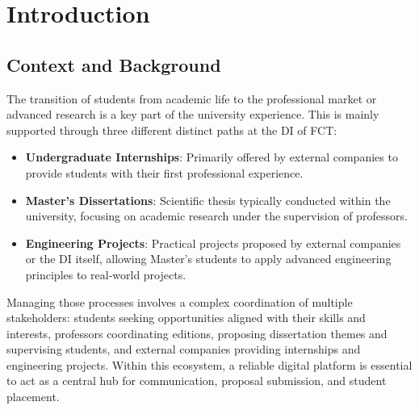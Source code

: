
%

\chapter{Introduction}
\label{cha:introduction}


\epigraphfontsize{\small\itshape}
\setlength\epigraphwidth{12.5cm}
\setlength\epigraphrule{0pt}

\section{Context and Background}
  \label{sec:intro_context_background}

  \ntindex[Template]{}
  {
    The transition of students from academic life to the professional 
    market or advanced research is a key part of the university experience. 
    This is mainly supported through three different distinct paths at the 
    \gls{DI} of \gls{FCT}:
  }

  

  \begin{itemize}
    \item {\textbf{Undergraduate Internships}: Primarily offered by external companies to provide students with their first professional experience.}
    \item {\textbf{Master's Dissertations}: Scientific thesis typically conducted within the university, focusing on academic research under the supervision of professors.}
    \item {\textbf{Engineering Projects}: Practical projects proposed by external companies or the \gls{DI} itself, allowing Master's students to apply advanced engineering principles to real-world projects.}
  \end{itemize}

  Managing those processes involves a complex coordination of multiple stakeholders: 
  students seeking opportunities aligned with their skills and interests, 
  professors coordinating editions, 
  proposing dissertation themes and supervising students, and external companies providing internships and engineering projects. 
  Within this ecosystem, a reliable digital platform is essential to act as a central 
  hub for communication, proposal submission, and student placement.

